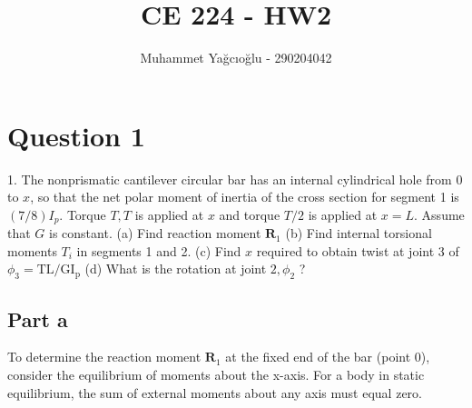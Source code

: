 \documentclass[12pt]{article}
\title{\vspace{-1cm}CE 224 - HW2}
\author{Muhammet Yağcıoğlu - 290204042}
\begin{document}
\maketitle\thispagestyle{fancy}
\pagestyle{fancy}
\tableofcontents
\newpage



\section*{Question 1}
\begin{q}
1. The nonprismatic cantilever circular bar has an internal cylindrical hole from 0 to \(x\), so that the net polar moment of inertia of the cross section for segment 1 is \((7 / 8) I_p\). Torque \(T, T\) is applied at \(x\) and torque \(T / 2\) is applied at \(x=L\). Assume that \(G\) is constant.
(a) Find reaction moment \(\mathbf{R}_1\)
(b) Find internal torsional moments \(T_i\) in segments 1 and 2.
(c) Find \(x\) required to obtain twist at joint 3 of \(\phi_3=\mathrm{TL} / \mathrm{GI}_{\mathrm{p}}\)
(d) What is the rotation at joint \(2, \phi_2\) ?
\end{q}


\begin{figure}[!ht]
    \centering
    \caption{}
    \label{fig:enter-label}
\end{figure}

\subsection*{Part a}
To determine the reaction moment \(\mathbf{R}_1\) at the fixed end of the bar (point \(0\)), consider the equilibrium of moments about the x-axis. For a body in static equilibrium, the sum of external moments about any axis must equal zero.
\end{document}
